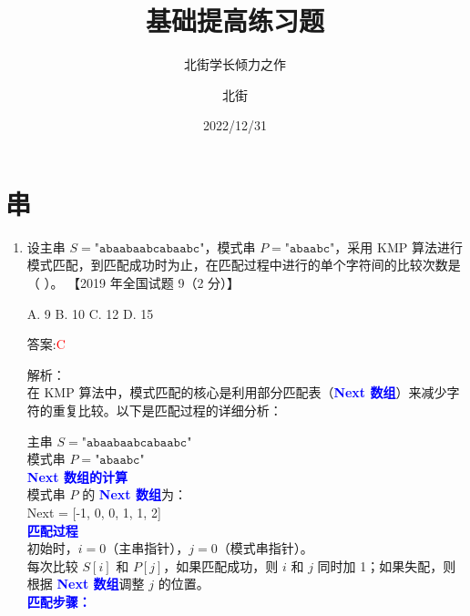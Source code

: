 \documentclass[lang=cn,newtx,10pt,scheme=chinese]{../../../elegantbook}
\title{基础提高练习题}
\subtitle{北街学长倾力之作}
\author{北街}
\date{2022/12/31}
\begin{document}
\maketitle
\frontmatter

\tableofcontents

\mainmatter

\chapter{串}
\begin{enumerate}

    \item 设主串 $S = \texttt{"abaabaabcabaabc"}$，模式串 $P = \texttt{"abaabc"}$，采用 KMP 算法进行模式匹配，到匹配成功时为止，在匹配过程中进行的单个字符间的比较次数是（ ）。  
    【2019 年全国试题 9（2 分）】

    A. 9 \quad B. 10 \quad C. 12 \quad D. 15  

    答案:\textcolor{red}{C}

    解析：\\
        在 KMP 算法中，模式匹配的核心是利用部分匹配表（\textbf{\textcolor{blue}{Next 数组}}）来减少字符的重复比较。以下是匹配过程的详细分析：
                
                主串 $S = \texttt{"abaabaabcabaabc"}$\\
                模式串 $P = \texttt{"abaabc"}$\\
                \textbf{\textcolor{blue}{Next 数组的计算}}\\
                模式串 $P$ 的 \textbf{\textcolor{blue}{Next 数组}}为：\\
                Next = [-1, 0, 0, 1, 1, 2]\\
                
                \textbf{\textcolor{blue}{匹配过程}}\\
                
                初始时，$i = 0$（主串指针），$j = 0$（模式串指针）。\\
                每次比较 $S[i]$ 和 $P[j]$，如果匹配成功，则 $i$ 和 $j$ 同时加 1；如果失配，则根据 \textbf{\textcolor{blue}{Next 数组}}调整 $j$ 的位置。\\
                \textbf{\textcolor{blue}{匹配步骤：}}\\
                

\end{enumerate}
\end{document}

